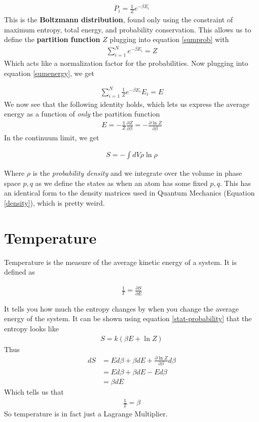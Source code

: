 \begin{align}\label{stat-probability}
P_i = \frac{1}{Z}e^{-\beta E_i}
\end{align}
This is the \textbf{Boltzmann distribution}, found only using the constraint of maximum entropy, total energy, and probability conservation. This allows us to define the \textbf{partition function} $Z$ plugging into equation \ref{sumprob} with
\begin{align}
\sum_{i=1}^N e^{-\beta E_i} = Z
\end{align}
Which acts like a normalization factor for the probabilities. Now plugging into equation \ref{sumenergy}, we get

\begin{align}
\sum_{i=1}^N \frac{1}{Z}e^{-\beta E_i}E_i = E
\end{align}
We now see that the following identity holds, which lets us express the average energy as a function of \emph{only} the partition function
\begin{align}\label{partenergy}
E = -\frac{1}{Z}\frac{\partial Z}{\partial \beta} = -\frac{\partial \ln Z}{\partial \beta}
\end{align}
In the continuum limit, we get 

\begin{align}
S = -\int dV \rho \ln\rho
\end{align}

Where $\rho$ is the \emph{probability density} and we integrate over the volume in phase space $p,q$ as we define the states as when an atom has some fixed $p, q$. This has an identical form to the density matrices  used in Quantum Mechanics (Equation \ref{density}), which is pretty weird.




\section{Temperature}
Temperature is the measure of the average kinetic energy of a system. It is defined as 

\begin{align}
\frac{1}{T}= \frac{\partial S}{\partial E}
\end{align}

It tells you how much the entropy changes by when you change the average energy of the system. It can be shown using equation \ref{stat-probability} that the entropy looks like
\begin{align}
S = k(\beta E + \ln Z)
\end{align}
Thus
\begin{align}
dS &= Ed\beta + \beta dE +\frac{\partial \ln Z}{\partial \beta}d\beta\\
&= Ed\beta + \beta dE -Ed\beta\\
&= \beta dE
\end{align}
Which tells us that
\begin{align}
\frac{1}{T} = \beta
\end{align}
So temperature is in fact just a Lagrange Multiplier.


